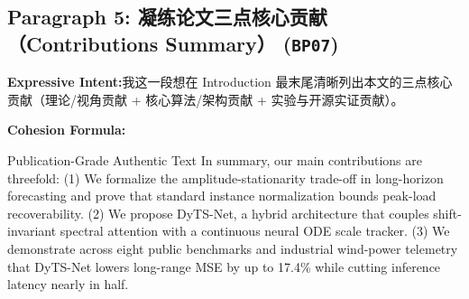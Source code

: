 \subsection*{Paragraph 5: 凝练论文三点核心贡献（Contributions Summary） (\texttt{BP07})}
\noindent\textbf{Expressive Intent:}\enspace 我这一段想在 Introduction 最末尾清晰列出本文的三点核心贡献（理论/视角贡献 + 核心算法/架构贡献 + 实验与开源实证贡献）。\par
\noindent\textbf{Cohesion Formula:}\par\vspace{4pt}
\begin{ExampleBox}{Publication-Grade Authentic Text}
In summary, our main contributions are threefold: (1) We formalize the amplitude-stationarity trade-off in long-horizon forecasting and prove that standard instance normalization bounds peak-load recoverability. (2) We propose DyTS-Net, a hybrid architecture that couples shift-invariant spectral attention with a continuous neural ODE scale tracker. (3) We demonstrate across eight public benchmarks and industrial wind-power telemetry that DyTS-Net lowers long-range MSE by up to 17.4\% while cutting inference latency nearly in half.
\end{ExampleBox}
